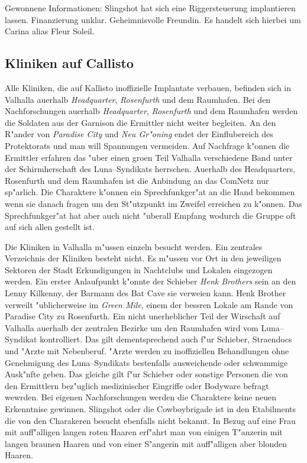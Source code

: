 \begin{remarks}
	Gewonnene Informationen: Slingshot hat sich eine Riggersteuerung implantieren lassen. Finanzierung unklar. Geheimnisvolle Freundin. Es handelt sich hierbei um Carina alias Fleur Soleil.
\end{remarks}


\subsection{Kliniken auf Callisto}

Alle Kliniken, die auf Kallisto inoffizielle Implantate verbauen, befinden sich in Valhalla au\3erhalb \emph{Headquarter}, \emph{Rosenfurth} und dem Raumhafen. Bei den Nachforschungen au\3erhalb \emph{Headquarter}, \emph{Rosenfurth} und dem Raumhafen werden die Soldaten aus der Garnison die Ermittler nicht weiter begleiten. An den R"ander von \emph{Paradise City} und \emph{Neu Gr"oning} endet der Einflu\3bereich des Protektorats und man will Spannungen vermeiden. Auf Nachfrage k"onnen die Ermittler erfahren das "uber einen gro\3en Teil Valhalla verschiedene Band unter der Schirmherschaft des Luna--Syndikats herrschen. Au\3erhalb des Headquarters, Rosenfurth und dem Raumhafen ist die Anbindung an das ComNetz nur sp"arlich. Die Charaktere k"onnen ein Sprechfunkger"at an die Hand bekommen wenn sie danach fragen um den St"utzpunkt im Zweifel erreichen zu k"onnen. Das Sprechfunkger"at hat aber auch nicht "uberall Empfang wodurch die Gruppe oft auf sich allen gestellt ist.

Die Kliniken in Valhalla m"ussen einzeln besucht werden. Ein zentrales Verzeichnis der Kliniken besteht nicht. Es m"ussen vor Ort in den jeweiligen Sektoren der Stadt Erkundigungen in Nachtclubs und Lokalen eingezogen werden. Ein erster Anlaufpunkt k"onnte der Schieber \emph{Henk Brothers} sein an den Lenny Kilkenny, der Barmann des Bat Cave sie verwei\3en kann. Henk Brother verweilt "ublicherweise im \emph{Green Mile}, einem der bessren Lokale am Rande von Paradise City zu Rosenfurth. Ein nicht unerheblicher Teil der Wirschaft auf Valhalla au\3erhalb der zentralen Bezirke um den Raumhafen wird vom Luna--Syndikat kontrolliert. Das gilt dementsprechend auch f"ur Schieber, Stra\3endocs und "Arzte mit Nebenberuf. "Arzte werden zu inoffiziellen Behandlungen ohne Genehmigung des Luna--Syndikats bestenfalls ausweichende oder schwammige Ausk"nfte geben. Das gleiche gilt f"ur Schieber oder sonstige Personen die von den Ermittlern bez"uglich medizinischer Eingriffe oder Bodyware befragt wewrden. Bei eigenen Nachforschungen werden die Charaktere keine neuen Erkenntnise gewinnen. Slingshot oder die Cowboybrigade ist in den Etabilments die von den Charakeren besucht ebenfalls  nicht bekannt. In Bezug auf eine Frau mit auff"alligen langen roten Haaren erf"ahrt man von einigen T"anzerin mit langen braunen Haaren und von einer S"angerin mit auff"alligen aber blonden Haaren.

